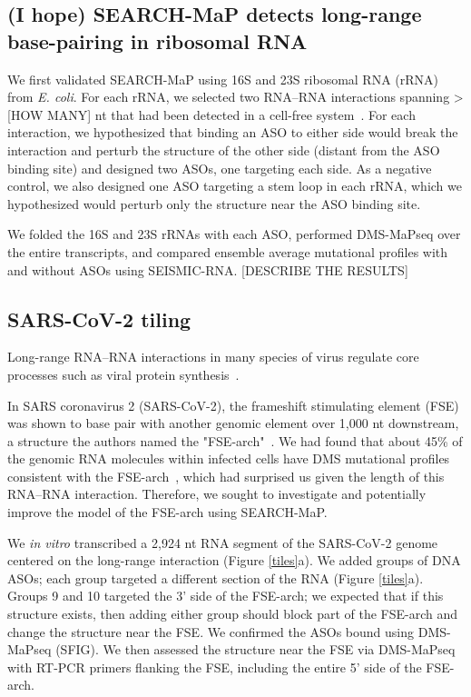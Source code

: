 \documentclass[main.tex]{subfiles}
\begin{document}
\subsection{(I hope) SEARCH-MaP detects long-range base-pairing in ribosomal RNA}

We first validated SEARCH-MaP using 16S and 23S ribosomal RNA (rRNA) from \textit{E. coli}.
For each rRNA, we selected two RNA--RNA interactions spanning > [HOW MANY] nt that had been detected in a cell-free system~\cite{Mustoe2019}.
For each interaction, we hypothesized that binding an ASO to either side would break the interaction and perturb the structure of the other side (distant from the ASO binding site) and designed two ASOs, one targeting each side.
As a negative control, we also designed one ASO targeting a stem loop in each rRNA, which we hypothesized would perturb only the structure near the ASO binding site.

We folded the 16S and 23S rRNAs with each ASO, performed DMS-MaPseq over the entire transcripts, and compared ensemble average mutational profiles with and without ASOs using SEISMIC-RNA.
[DESCRIBE THE RESULTS]

\begin{figure}[H]
	\caption{}
	\label{rrna}
\end{figure}


\subsection{SARS-CoV-2 tiling}

Long-range RNA--RNA interactions in many species of virus regulate core processes such as viral protein synthesis~\cite{Nicholson2014}.

In SARS coronavirus 2 (SARS-CoV-2), the frameshift stimulating element (FSE) was shown to base pair with another genomic element over 1,000 nt downstream, a structure the authors named the "FSE-arch"~\cite{Ziv2020}.
We had found that about 45\% of the genomic RNA molecules within infected cells have DMS mutational profiles consistent with the FSE-arch~\cite{Lan2022}, which had surprised us given the length of this RNA--RNA interaction.
Therefore, we sought to investigate and potentially improve the model of the FSE-arch using SEARCH-MaP.

We \textit{in vitro} transcribed a 2,924 nt RNA segment of the SARS-CoV-2 genome centered on the long-range interaction (Figure \ref{tiles}a).
We added groups of DNA ASOs; each group targeted a different section of the RNA (Figure \ref{tiles}a).
Groups 9 and 10 targeted the 3' side of the FSE-arch; we expected that if this structure exists, then adding either group should block part of the FSE-arch and change the structure near the FSE.
We confirmed the ASOs bound using DMS-MaPseq (SFIG).
We then assessed the structure near the FSE via DMS-MaPseq with RT-PCR primers flanking the FSE, including the entire 5' side of the FSE-arch.
\end{document}
